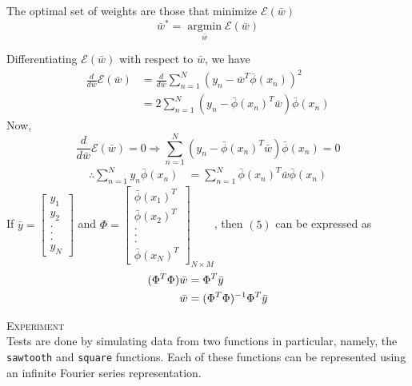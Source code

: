 \documentclass[a4paper,12pt]{article}
\begin{document}
The optimal set of weights are those that minimize $\mathcal{E}(\bar{w})$
\[ \bar{w}^* = \displaystyle\operatorname*{argmin}_{\bar{w}} \mathcal{E}(\bar{w}) \]

Differentiating $\mathcal{E}(\bar{w})$ with respect to $\bar{w}$, we have
\begin{align*}
 \frac{d}{d\bar{w}}\mathcal{E}(\bar{w}) &= \frac{d}{d\bar{w}}\sum_{n=1}^N (y_n-\bar{w}^T \bar{\phi}(x_n))^2 \\
					 &= 2 \sum_{n=1}^N (y_n- \bar{\phi}(x_n)^T\bar{w})\bar{\phi}(x_n) 
\end{align*}
Now,
\[ \frac{d}{d\bar{w}}\mathcal{E}(\bar{w}) = 0 \Rightarrow \sum_{n=1}^N (y_n - \bar{\phi}(x_n)^T\bar{w})\bar{\phi}(x_n) = 0 \]
\begin{align}
\therefore \sum_{n=1}^N y_n \bar{\phi}(x_n) &= \sum_{n=1}^N \bar{\phi}(x_n)^T \bar{w} \bar{\phi}(x_n)
\end{align}
If $
    \bar{y} = \left[ 
		      \begin{array}{c}
		       y_1 \\ y_2 \\ . \\ . \\ . \\ y_N
		      \end{array}
	      \right]
   $
 and $
      \Phi = \left[
		      \begin{array}{c}
		       \bar{\phi}(x_1)^T \\ \bar{\phi}(x_2)^T \\ . \\ . \\. \\ \bar{\phi}(x_N)^T
		      \end{array}
	     \right]_{N\times M} 
     $,
then $(5)$ can be expressed as
\begin{align}
(\Phi^T \Phi) \bar{w} &= \Phi^T \bar{y} \notag \\
	      \bar{w} &= (\Phi^T \Phi)^{-1} \Phi^T \bar{y}
\end{align}

\noindent \textsc{Experiment} \\
Tests are done by simulating data from two functions in particular, namely, the \texttt{sawtooth} and \texttt{square} functions. Each of these functions can be represented using an infinite Fourier series representation.  \\
\end{document}
